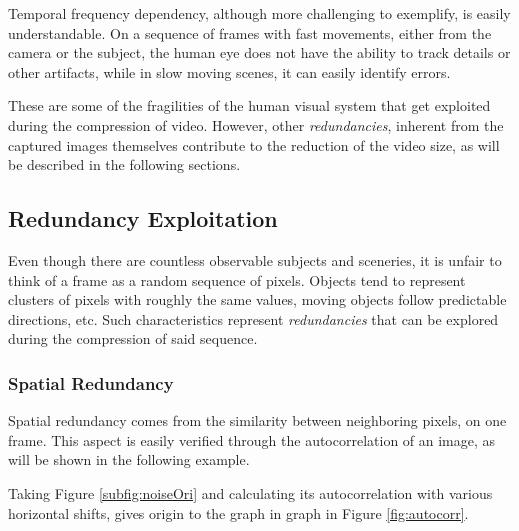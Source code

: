 Temporal frequency dependency, although more challenging to exemplify, is easily understandable. On a sequence of frames with fast movements, either from the camera or the subject, the human eye does not have the ability to track details or other artifacts, while in slow moving scenes, it can easily identify errors.

These are some of the fragilities of the human visual system that get exploited during the compression of video. However, other \emph{redundancies}, inherent from the captured images themselves contribute to the reduction of the video size, as will be described in the following sections.

\subsection{Redundancy Exploitation}


Even though there are countless observable subjects and sceneries, it is unfair to think of a frame as a random sequence of pixels. Objects tend to represent clusters of pixels with roughly the same values, moving objects follow predictable directions, etc. Such characteristics represent \emph{redundancies} that can be explored during the compression of said sequence.

\subsubsection{Spatial Redundancy} \label{sssec:spatred}

Spatial redundancy comes from the similarity between neighboring pixels, on one frame. This aspect is easily verified through the autocorrelation of an image, as will be shown in the following example.

Taking Figure \ref{subfig:noiseOri} and calculating its autocorrelation with various horizontal shifts, gives origin to the graph in graph in Figure \ref{fig:autocorr}.

